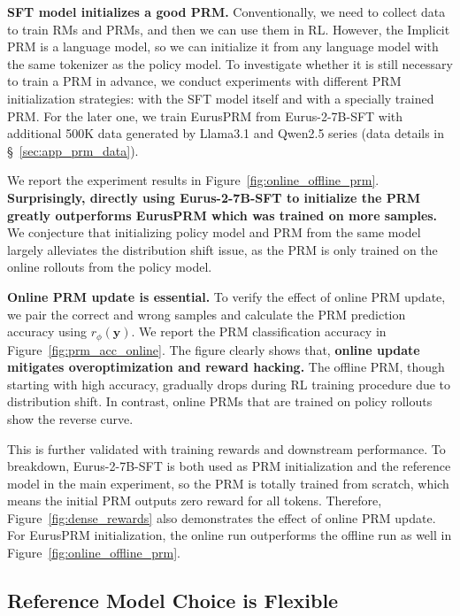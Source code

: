 \textbf{SFT model initializes a good PRM.}
Conventionally, we need to collect data to train RMs and PRMs, and then we can use them in RL. However, the Implicit PRM is a language model, so we can initialize it from any language model with the same tokenizer as the policy model. To investigate whether it is still necessary to train a PRM in advance, we conduct experiments with different PRM initialization strategies: with the SFT model itself and with a specially trained PRM. For the later one, we train EurusPRM from Eurus-2-7B-SFT with additional 500K data generated by Llama3.1 and Qwen2.5 series (data details in \S~\ref{sec:app_prm_data}). 


We report the experiment results in Figure~\ref{fig:online_offline_prm}. \textbf{Surprisingly, directly using Eurus-2-7B-SFT to initialize the PRM greatly outperforms EurusPRM which was trained on more samples.} We conjecture that initializing policy model and PRM from the same model largely alleviates the distribution shift issue, as the PRM is only trained on the online rollouts from the policy model.

\textbf{Online PRM update is essential.}
To verify the effect of online PRM update, we pair the correct and wrong samples and calculate the PRM prediction accuracy using $r_\phi(\mathbf{y})$.
We report the PRM classification accuracy in Figure~\ref{fig:prm_acc_online}. 
The figure clearly shows that, \textbf{online update mitigates overoptimization and reward hacking.}
The offline PRM, though starting with high accuracy, gradually drops during RL training procedure due to distribution shift. In contrast, online PRMs that are trained on policy rollouts show the reverse curve.


This is further validated with training rewards and downstream performance. To breakdown, Eurus-2-7B-SFT is both used as PRM initialization and the reference model in the main experiment, so the PRM is totally trained from scratch, which means the initial PRM outputs zero reward for all tokens. Therefore, Figure~\ref{fig:dense_rewards} also demonstrates the effect of online PRM update. For EurusPRM initialization, the online run outperforms the offline run as well in Figure~\ref{fig:online_offline_prm}.


\subsection{Reference Model Choice is Flexible} 

